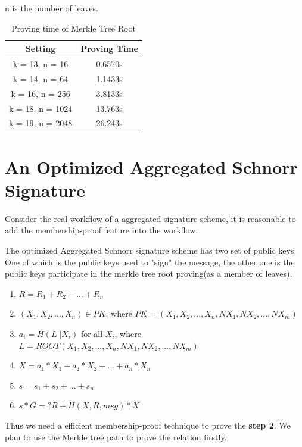 \documentclass{article}
\begin{document}
n is the number of leaves.

\begin{table}[H]
    \centering
    \begin{tabular}{c|c} \hline
        Setting & Proving Time \\ \hline
         k = 13, n = 16& 0.6570s  \\ \hline
         k = 14, n = 64& 1.1433s \\ \hline
         k = 16, n = 256& 3.8133s \\ \hline
         k = 18, n = 1024& 13.763s \\ \hline
         k = 19, n = 2048& 26.243s \\ \hline
    \end{tabular}
    \caption{Proving time of Merkle Tree Root}
    \label{tab:my_label}
\end{table}


\section{An Optimized Aggregated Schnorr Signature}

Consider the real workflow of a aggregated signature scheme, it is reasonable to add the membership-proof feature into the workflow.

The optimized Aggregated Schnorr signature scheme has two set of public keys. One of which is the public keys used to "sign" the message, the other one is the public keys participate in the merkle tree root proving(as a member of leaves).
\begin{enumerate}
    \item  $R = R_1 + R_2 + ... + R_n$
    \item $(X_1, X_2, ... , X_n) \in PK$, where $PK = (X_1, X_2, ... , X_n, NX_1, NX_2, ... , NX_m)$
    \item $a_i = H(L || X_i)$ for all $X_i$, where $L = ROOT(X_1, X_2, ... , X_n, NX_1, NX_2, ... , NX_m)$
    \item $X = a_1*X_1 + a_2*X_2 +...+ a_n*X_n$
    \item $s = s_1 + s_2 + ... + s_n$
    \item $s*G =? R+H(X, R, msg)*X$
\end{enumerate}

Thus we need a efficient membership-proof technique to prove the \textbf{step 2}. We plan to use the Merkle tree path to prove the relation firstly.
\end{document}
